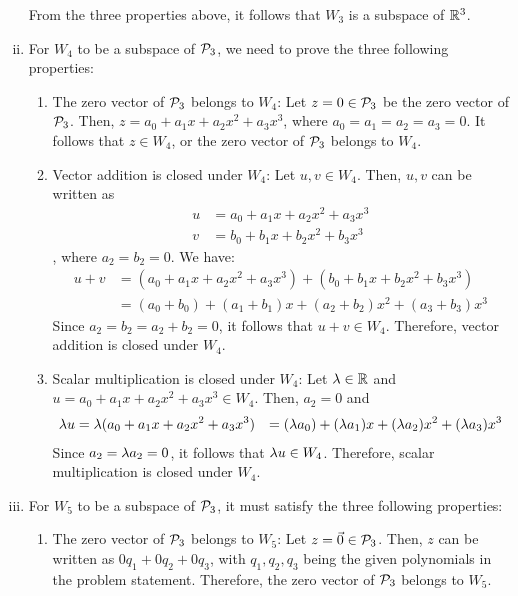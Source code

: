 \begin{sol}
\begin{enumerate}[(i)]
        From the three properties above, it follows that $W_3$ is a subspace of $\R^{3}$.
        \item For $W_4$ to be a subspace of $\P_3$, we need to prove the three following properties:
        \begin{enumerate}[(1)]
            \item The zero vector of $\P_3$ belongs to $W_4$: Let $z=0\in\P_3$ be the zero vector of $\P_3$. Then, $z=a_0+a_1x+a_2x^{2}+a_3x^{3}$, where $a_0=a_1=a_2=a_3=0$. It follows that $z\in W_4$, or the zero vector of $\P_3$ belongs to $W_4$.
            \item Vector addition is closed under $W_4$: Let $u,v\in W_4$. Then, $u, v$ can be written as
            \[
                \begin{aligned}
                    u & = a_0+a_1x+a_2x^{2}+a_3x^{3} \\
                    v & = b_0+b_1x+b_2x^{2}+b_3x^{3}
                \end{aligned}
            \]
            , where $a_2=b_2=0$. We have:
            \[
                \begin{aligned}
                    u+v & = (a_0+a_1x+a_2x^{2}+a_3x^{3})+(b_0+b_1x+b_2x^{2}+b_3x^{3}) \\
                        & = (a_0+b_0)+(a_1+b_1)x+(a_2+b_2)x^{2}+(a_3+b_3)x^{3}
                \end{aligned}
            \]
            Since $a_2=b_2=a_2+b_2=0$, it follows that $u+v\in W_4$. Therefore, vector addition is closed under $W_4$.
            \item Scalar multiplication is closed under $W_4$: Let $\lam\in\R$ and $u=a_0+a_1x+a_2x^{2}+a_3x^{3}\in W_4$. Then, $a_2=0$ and
            \[
                \begin{aligned}
                    \lam u & = \lam(a_0+a_1x+a_2x^{2}+a_3x^{3})
                            & = (\lam a_0)+(\lam a_1)x+(\lam a_2)x^{2}+(\lam a_3)x^{3}
                \end{aligned}
            \]
            Since $a_2=\lam a_2=0$, it follows that $\lam u\in W_4$. Therefore, scalar multiplication is closed under $W_4$.
        \end{enumerate}
        \item For $W_5$ to be a subspace of $\P_3$, it must satisfy the three following properties:
        \begin{enumerate}[(1)]
            \item The zero vector of $\P_3$ belongs to $W_5$: Let $z=\vec{0}\in\P_3$. Then, $z$ can be written as $0q_1+0q_2+0q_3$, with $q_1,q_2,q_3$ being the given polynomials in the problem statement. Therefore, the zero vector of $\P_3$ belongs to $W_5$.

\end{enumerate}
\end{enumerate}
\end{sol}
